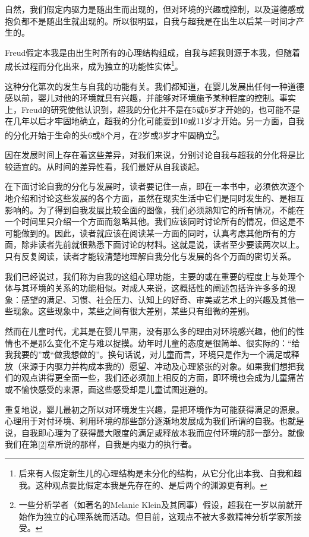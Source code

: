 \documentclass[UTF8,10pt,a4paper,openany]{book}
\begin{document}
自然，我们假定内驱力是随出生而出现的，但对环境的兴趣或控制，以及道德感或抱负都不是随出生就出现的。所以很明显，自我与超我是在出生以后某一时间才产生的。

Freud假定本我是由出生时所有的心理结构组成，自我与超我则源于本我，但随着成长过程而分化出来，成为独立的功能性实体\footnote{后来有人假定新生儿的心理结构是未分化的结构，从它分化出本我、自我和超我。这种观点要比假定本我是先存在的、是后两个的渊源更有利。}。

这种分化第次的发生与自我的功能有关。我们都知道，在婴儿发展出任何一种道德感以前，婴儿对他的环境就具有兴趣，并能够对环境施予某种程度的控制。事实上，Freud的研究使他认识到，超我的分化并不是在5或6岁才开始的，也可能不是在几年以后才牢固地确立，超我的分化可能要到10或11岁才开始。另一方面，自我的分化开始于生命的头6或8个月，在2岁或3岁才牢固确立\footnote{一些分析学者（如著名的Melanie Klein及其同事）假设，超我在一岁以前就开始作为独立的心理系统而活动。但目前，这观点不被大多数精神分析学家所接受。}。

因在发展时间上存在着这些差异，对我们来说，分别讨论自我与超我的分化将是比较适宜的。从时间的差异性看，我们最好从自我谈起。

在下面讨论自我的分化与发展时，读者要记住一点，即在一本书中，必须依次逐个地介绍和讨论这些发展的各个方面，虽然在现实生活中它们是同时发生的、是相互影响的。为了得到自我发展比较全面的图像，我们必须熟知它的所有情况，不能在一个时间里只介绍一个方面而忽略其他。我们应该同时讨论所有的情况，但这是不可能做到的。因此，读者就应该在阅读某一方面的同时，认真考虑其他所有的方面，除非读者先前就很熟悉下面讨论的材料。这就是说，读者至少要读两次以上。只有反复阅读，读者才能较清楚地理解自我分化与发展的各个万面的密切关系。

我们已经说过，我们称为自我的这组心理功能，主要的或在重要的程度上与处理个体与其环境的关系的功能相似。对成人来说，这概括性的阐述包括许许多多的现象：感望的满足、习惯、社会压力、认知上的好奇、审美或艺术上的兴趣及其他一些现象。这些现象中，某些之间有很大差别，某些只有细微的差别。

然而在儿童时代，尤其是在婴儿早期，没有那么多的理由对环境感兴趣，他们的性情也不是那么变化不定与难以捉摸。幼年时儿童的态度是很简单、很实际的：“给我我要的”或“做我想做的”。换句话说，对儿童而言，环境只是作为一个满足或释放（来源于内驱力并构成本我的）愿望、冲动及心理紧张的对象。如果我们想把我们的观点讲得更全面一些，我们还必须加上相反的方面，即环境也会成为儿童痛苦或不愉快感受的来源，面这些感受却是儿童试图逃避的。

重复地说，婴儿最初之所以对环境发生兴趣，是把环境作为可能获得满足的源泉。心理用于对付环境、利用环境的那些部分逐渐地发展成为我们所谓的自我。也就是说，自我即心理为了获得最大限度的满足或释放本我而应付环境的那一部分。就像我们在第\ref{2}章所说的那样，自我是内驱力的执行者。
\end{document}
